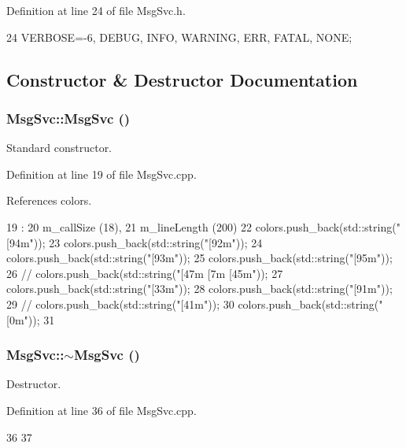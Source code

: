Definition at line 24 of file MsgSvc.h.


\begin{DoxyCode}
24 {VERBOSE=-6, DEBUG, INFO, WARNING, ERR, FATAL, NONE};
\end{DoxyCode}


\subsection{Constructor \& Destructor Documentation}
\hypertarget{classMsgSvc_a67dd82487821da06312e20c1fc68b85a}{
\subsubsection[{MsgSvc}]{\setlength{\rightskip}{0pt plus 5cm}MsgSvc::MsgSvc ()}}
\label{classMsgSvc_a67dd82487821da06312e20c1fc68b85a}


Standard constructor. 

Definition at line 19 of file MsgSvc.cpp.

References colors.


\begin{DoxyCode}
19                  : 
20   m_callSize   (18),
21   m_lineLength (200){
22   colors.push_back(std::string("[94m"));
23   colors.push_back(std::string("[92m"));
24   colors.push_back(std::string("[93m"));
25   colors.push_back(std::string("[95m"));
26 //  colors.push_back(std::string("[47m [7m [45m"));
27   colors.push_back(std::string("[33m"));
28   colors.push_back(std::string("[91m"));
29 //  colors.push_back(std::string("[41m"));
30   colors.push_back(std::string("[0m"));
31 }
\end{DoxyCode}
\hypertarget{classMsgSvc_a07f15da0052e8703a89b2fc66382fe0e}{
\subsubsection[{$\sim$MsgSvc}]{\setlength{\rightskip}{0pt plus 5cm}MsgSvc::$\sim$MsgSvc ()}}
\label{classMsgSvc_a07f15da0052e8703a89b2fc66382fe0e}


Destructor. 

Definition at line 36 of file MsgSvc.cpp.


\begin{DoxyCode}
36                 {
37 } 
\end{DoxyCode}


